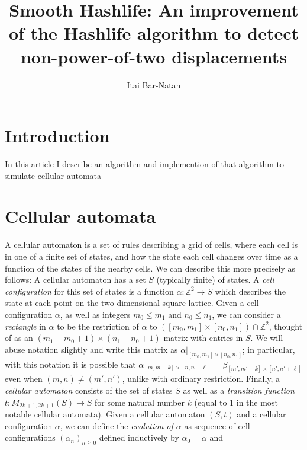 \documentclass{article}
\theoremstyle{definition}
\begin{document}
\title{Smooth Hashlife: An improvement of the Hashlife algorithm to detect
non-power-of-two displacements}
\author{Itai Bar-Natan}
\maketitle

\tableofcontents

\section{Introduction}

In this article I describe an algorithm and implemention of that algorithm to
simulate cellular automata

\section{Cellular automata}

A cellular automaton is a set of rules describing a grid of cells, where each
cell is in one of a finite set of states, and how the state each cell changes
over time as a function of the states of the nearby cells. We can describe this
more precisely as follows: A cellular automaton has a set $S$ (typically finite)
of states. A \emph {cell configuration} for this set of states is a function
$\alpha : \mathbb {Z}^2 \to S$ which describes the state at each point on the
two-dimensional square lattice. Given a cell configuration $\alpha$, as well as
integers $m_0 \leq m_1$ and $n_0 \leq n_1$, we can consider a \emph {rectangle}
in $\alpha$ to be the restriction of $\alpha$ to $([m_0, m_1] \times [n_0, n_1])
\cap \mathbb {Z}^2$, thought of as an $(m_1-m_0+1) \times (n_1-n_0+1)$ matrix
with entries in $S$. We will abuse notation slightly and write this matrix as
$\alpha |_{[m_0, m_1] \times [n_0, n_1]}$; in particular, with this notation it
is possible that $\alpha _{[m, m+k] \times [n, n+\ell]} = \beta _{[m', m'+k]
\times [n', n'+\ell]}$ even when $(m, n) \neq (m', n')$, unlike with ordinary
restriction. Finally, a \emph {cellular automaton} consists of the set of states
$S$ as well as a \emph {transition function} $t : M _{2k+1, 2k+1} (S) \to S$ for
some natural number $k$ (equal to $1$ in the most notable cellular automata).
Given a cellular automaton $(S, t)$ and a cellular configuration $\alpha$, we
can define the \emph {evolution of $\alpha$} as sequence of cell configurations
$(\alpha_n) _{n \geq 0}$ defined inductively by $\alpha_0 = \alpha$ and
\end{document}
